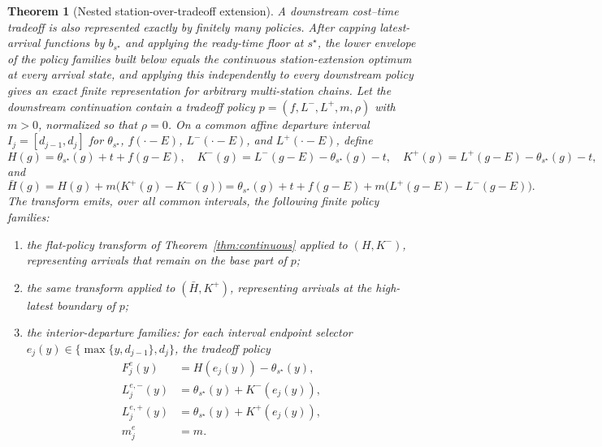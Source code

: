 \documentclass[review,3p,authoryear]{elsarticle}
\theoremstyle{plain}
\newtheorem{theorem}{Theorem}
\theoremstyle{definition}
\theoremstyle{remark}
\begin{document}
\begin{theorem}[Nested station-over-tradeoff extension]
\label{thm:nested}
A downstream cost--time tradeoff is also represented exactly by finitely many
policies. After capping latest-arrival functions by $b_{s^\star}$ and applying the
ready-time floor at $s^\star$, the lower envelope of the policy families built below
equals the continuous station-extension optimum at every arrival state, and applying
this independently to every downstream policy gives an exact finite representation
for arbitrary multi-station chains. Let the downstream continuation contain a tradeoff policy
$p=(f,L^-,L^+,m,\rho)$ with $m>0$, normalized so that $\rho=0$. On a common affine departure interval
$I_j=[d_{j-1},d_j]$ for
$\theta_{s^\star}$, $f(\cdot-E)$, $L^-(\cdot-E)$, and $L^+(\cdot-E)$, define
\[
H(g)=\theta_{s^\star}(g)+t+f(g-E),\quad
K^-(g)=L^-(g-E)-\theta_{s^\star}(g)-t,\quad
K^+(g)=L^+(g-E)-\theta_{s^\star}(g)-t,
\]
and
\[
\bar H(g)=H(g)+m\bigl(K^+(g)-K^-(g)\bigr)
          =\theta_{s^\star}(g)+t+f(g-E)+m\bigl(L^+(g-E)-L^-(g-E)\bigr).
\]
The transform emits, over all common intervals, the following finite policy
families:

\begin{enumerate}[label=(\roman*)]
\item the flat-policy transform of Theorem~\ref{thm:continuous} applied to
$(H,K^-)$, representing arrivals that remain on the base part of $p$;
\item the same transform applied to $(\bar H,K^+)$, representing arrivals at
the high-latest boundary of $p$;
\item the interior-departure families: for each interval endpoint selector
\(e_j(y)\in\{\max\{y,d_{j-1}\},d_j\}\),
the tradeoff policy
\[
\begin{aligned}
F_j^e(y)&=H(e_j(y))-\theta_{s^\star}(y),\\
L_{j}^{e,-}(y)&=\theta_{s^\star}(y)+K^-(e_j(y)),\\
L_{j}^{e,+}(y)&=\theta_{s^\star}(y)+K^+(e_j(y)),\\
m_j^e&=m .
\end{aligned}
\]
\end{enumerate}
\end{theorem}
\end{document}
